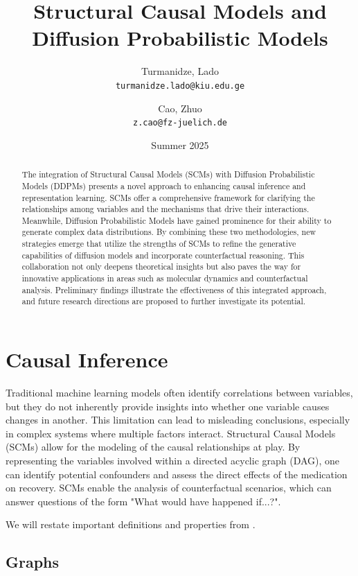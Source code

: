 \documentclass{article}
\title{Structural Causal Models and Diffusion Probabilistic Models}
\date{Summer 2025}
\author{
	Turmanidze, Lado\\
	\texttt{turmanidze.lado@kiu.edu.ge}
	\and
	Cao, Zhuo\\
	\texttt{z.cao@fz-juelich.de}
}
\begin{document}
	
	\maketitle
	
	\begin{abstract}
	The integration of Structural Causal Models (SCMs) with Diffusion Probabilistic Models (DDPMs) presents a novel approach to enhancing causal inference and representation learning. SCMs offer a comprehensive framework for clarifying the relationships among variables and the mechanisms that drive their interactions. Meanwhile, Diffusion Probabilistic Models have gained prominence for their ability to generate complex data distributions. By combining these two methodologies, new strategies emerge that utilize the strengths of SCMs to refine the generative capabilities of diffusion models and incorporate counterfactual reasoning. This collaboration not only deepens theoretical insights but also paves the way for innovative applications in areas such as molecular dynamics and counterfactual analysis. Preliminary findings illustrate the effectiveness of this integrated approach, and future research directions are proposed to further investigate its potential.
	\end{abstract}
	
	\section{Causal Inference}
	
	Traditional machine learning models often identify correlations between variables, but they do not inherently provide insights into whether one variable causes changes in another. This limitation can lead to misleading conclusions, especially in complex systems where multiple factors interact. Structural Causal Models (SCMs) allow for the modeling of the causal relationships at play. By representing the variables involved within a directed acyclic graph (DAG), one can identify potential confounders and assess the direct effects of the medication on recovery. SCMs enable the analysis of counterfactual scenarios, which can answer questions of the form "What would have happened if...?".
	
	We will restate important definitions and properties from \cite{peters2017}.
	
	 
	\subsection{Graphs}
	
\end{document}
